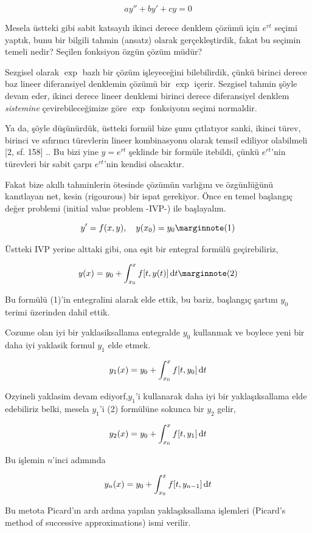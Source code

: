 \documentclass[12pt,fleqn]{article}\usepackage{../../common}
\begin{document}
$$
ay'' + by' + cy = 0
$$

Mesela üstteki gibi sabit katsayılı ikinci derece denklem çözümü için $e^{rt}$
seçimi yaptık, bunu bir bilgili tahmin (ansatz) olarak gerçekleştirdik, fakat bu
seçimin temeli nedir? Seçilen fonksiyon özgün çözüm müdür?

Sezgisel olarak $\exp$ bazlı bir çözüm işleyeceğini bilebilirdik, çünkü birinci
derece baz lineer diferansiyel denklemin çözümü bir $\exp$ içerir. Sezgisel
tahmin şöyle devam eder, ikinci derece lineer denklemi birinci derece
diferansiyel denklem {\em sistemine} çevirebileceğimize göre $\exp$ fonksiyonu
seçimi normaldir.

Ya da, şöyle düşünürdük, üstteki formül bize şunu çıtlatıyor sanki, ikinci
türev, birinci ve sıfırıncı türevlerin lineer kombinasyonu olarak temsil
ediliyor olabilmeli [2, sf. 158] .. Bu bizi yine $y = e^{rt}$ şeklinde bir
formüle itebildi, çünkü $e^{rt}$'nin türevleri bir sabit çarpı $e^{rt}$'nin
kendisi olacaktır.

Fakat bize akıllı tahminlerin ötesinde çözümün varlığını ve özgünlüğünü
kanıtlayan net, kesin (rigourous) bir ispat gerekiyor. Önce en temel başlangıç
değer problemi (initial value problem -IVP-) ile başlayalım.

$$
y' = f(x,y), \quad y(x_0) = y_0
\mlabel{1}
$$

Üstteki IVP yerine alttaki gibi, ona eşit bir entegral formülü geçirebiliriz,

$$
y(x) = y_0 + \int_{x_0}^{x} f[t, y(t)] \ud t
\mlabel{2}
$$

Bu formülü (1)'in entegralini alarak elde ettik, bu bariz, başlangıç şartını
$y_0$ terimi üzerinden dahil ettik.

Cozume olan iyi bir yaklasiksallama entegralde $y_0$ kullanmak ve boylece
yeni bir daha iyi yaklasik formul $y_1$ elde etmek.

$$
y_1(x) = y_0 + \int_{x_0}^{x} f[t, y_0] \,\mathrm{d} t
$$

Ozyineli yaklasim devam ediyorf,$y_1$'i kullanarak daha iyi bir yaklaşıksallama
elde edebiliriz belki, mesela $y_1$'i (2) formülüne sokunca bir $y_2$ gelir,

$$
y_2(x) = y_0 + \int_{x_0}^{x} f[t, y_1] \,\mathrm{d} t
$$

Bu işlemin $n$'inci adımında

$$
y_{n}(x) = y_0 + \int_{x_0}^{x} f[t, y_{n-1}] \,\mathrm{d} t
$$

Bu metota Picard'ın ardı ardına yapılan yaklaşıksallama işlemleri (Picard's
method of successive approximations) ismi verilir.
\end{document}
